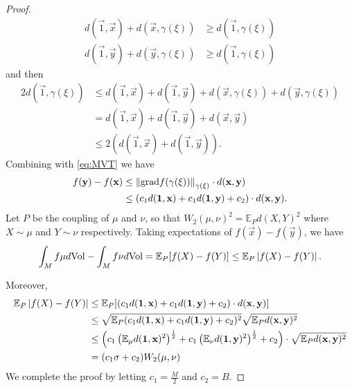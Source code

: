 \begin{proof}
\begin{equation}
\begin{split}
d(\vec{1},\vec{x})+d(\vec{x},\gamma(\xi))&\ge d(\vec{1},\gamma(\xi))
\\
d(\vec{1},\vec{y})+d(\vec{y},\gamma(\xi))&\ge d(\vec{1},\gamma(\xi))
\end{split}
\end{equation}
and then
\begin{equation}
\begin{split}
2d(\vec{1},\gamma(\xi))&\le d(\vec{1},\vec{x})+d(\vec{1},\vec{y})+d(\vec{x},\gamma(\xi))+d(\vec{y},\gamma(\xi))
\\
&=d(\vec{1},\vec{x})+d(\vec{1},\vec{y})+d(\vec{x},\vec{y})
\\
&\le 2\left(d(\vec{1},\vec{x})+d(\vec{1},\vec{y})\right).
\end{split}
\end{equation}
Combining with \ref{eq:MVT} we have
\begin{equation}
\begin{split}
f(\mathbf{y})-f(\mathbf{x})&\le \left\Vert \mathrm{grad} f(\gamma(\xi)) \right\Vert_{\gamma(\xi)}\cdot d(\mathbf{x},\mathbf{y})
\\
&\le\left(c_1d(\mathbf{1},\mathbf{x})+c_1d(\mathbf{1},\mathbf{y})+c_2\right)\cdot d(\mathbf{x},\mathbf{y}).
\end{split}
\end{equation}
Let $P$ be the coupling of $\mu$ and $\nu$, so that $W_2(\mu,\nu)^2=\mathbb{E}_Pd(X,Y)^2$ where $X\sim\mu$ and $Y\sim\nu$ respectively. Taking expectations of $f(\vec{x})-f(\vec{y})$, we have
\begin{equation}
\begin{split}
\int_M f\mu d\mathrm{Vol}-\int_M f\nu d\mathrm{Vol}=\mathbb{E}_P[f(X)-f(Y)]\le\mathbb{E}_P\left|f(X)-f(Y)\right|.
\end{split}
\end{equation}

Moreover, 
\begin{equation}
\begin{split}
\mathbb{E}_P\left|f(X)-f(Y)\right|&\le \mathbb{E}_P[(c_1d(\mathbf{1},\mathbf{x})+c_1d(\mathbf{1},\mathbf{y})+c_2)\cdot d(\mathbf{x},\mathbf{y})]
\\
&\le \sqrt{\mathbb{E}_P(c_1d(\mathbf{1},\mathbf{x})+c_1d(\mathbf{1},\mathbf{y})+c_2)^2}\sqrt{\mathbb{E}_Pd(\mathbf{x},\mathbf{y})^2}
\\
&\le \left(c_1\left(\mathbb{E}_{\mu}d(\mathbf{1},\mathbf{x})^2\right)^{\frac{1}{2}}+c_1\left(\mathbb{E}_{\nu}d(\mathbf{1},\mathbf{y})^2\right)^{\frac{1}{2}}+c_2\right)\cdot\sqrt{\mathbb{E}_Pd(\mathbf{x},\mathbf{y})^2}
\\
&=(c_1\sigma+c_2)W_2(\mu,\nu)
\end{split}
\end{equation}
We complete the proof by letting $c_1=\frac{M}{2}$ and $c_2=B$.
\end{proof}


